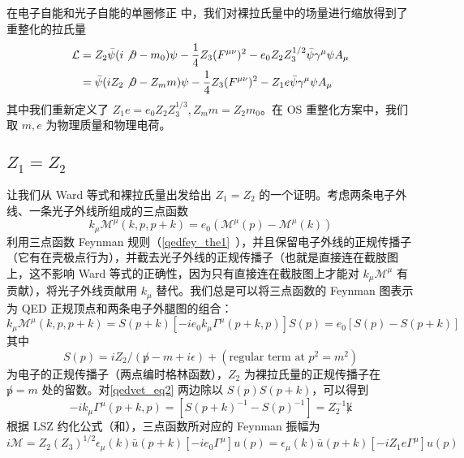 

在电子自能和光子自能的单圈修正 中，我们对裸拉氏量中的场量进行缩放得到了重整化的拉氏量
\begin{equation}
\begin{aligned}
\mathcal{L} &= Z_2\bar\psi (i\not\partial - m_0)\psi - \frac{1}{4}Z_3 (F^{\mu\nu})^2-e_0Z_2Z_3^{1/2} \bar\psi \gamma^\mu\psi A_\mu\\
&=\bar\psi (iZ_2\not\partial - Z_m m)\psi - \frac{1}{4}Z_3 (F^{\mu\nu})^2-Z_1 e \bar\psi \gamma^\mu\psi A_\mu
\end{aligned}
\end{equation}
其中我们重新定义了 $Z_1e=e_0 Z_2 Z_3^{1/3},Z_m m=Z_2 m_0$。在 OS 重整化方案中，我们取 $m,e$ 为物理质量和物理电荷。

\subsection{$Z_1=Z_2$}
让我们从 Ward 等式和裸拉氏量出发给出 $Z_1=Z_2$ 的一个证明。考虑两条电子外线、一条光子外线所组成的三点函数
\begin{equation}
k_\mu \mathcal{M}^\mu(k,p,p+k)=e_0(\mathcal{M}^{\mu}(p)- \mathcal{M}^{\mu}(k))
\end{equation}
利用三点函数 Feynman 规则（\autoref{qedfey_the1}~），并且保留电子外线的正规传播子（它有在壳极点行为），并截去光子外线的正规传播子（也就是直接连在截肢图上，这不影响 Ward 等式的正确性，因为只有直接连在截肢图上才能对 $k_\mu \mathcal{M}^\mu$ 有贡献），将光子外线贡献用 $k_\mu$ 替代。我们总是可以将三点函数的 Feynman 图表示为 QED 正规顶点和两条电子外腿图的组合：
\begin{equation}\label{qedvet_eq2}
k_\mu \mathcal{M}^\mu(k,p,p+k) = S(p+k) [-ie_0k_\mu \Gamma^\mu(p+k,p)] S(p) =e_0[S(p)-S(p+k)]
\end{equation}
其中
\begin{equation}
S(p)=iZ_2/(\not p-m+i\epsilon)+(\text{regular term at } p^2=m^2)
\end{equation}
为电子的正规传播子（两点编时格林函数），$Z_2$ 为裸拉氏量的正规传播子在 $\not p=m$ 处的留数。对\autoref{qedvet_eq2} 两边除以 $S(p)S(p+k)$，可以得到
\begin{equation}
-ik_\mu \Gamma^\mu(p+k,p) = [S(p+k)^{-1}-S(p)^{-1}]= Z_2^{-1}\not k
\end{equation}
根据 LSZ 约化公式（和），三点函数所对应的 Feynman 振幅为
\begin{equation}
i\mathcal{M} = Z_2(Z_3)^{1/2}\epsilon_\mu(k)\bar u(p+k)[-ie_0\Gamma^\mu] u(p)=\epsilon_\mu(k)\bar u(p+k)[-iZ_1 e\Gamma^\mu] u(p)
\end{equation}




